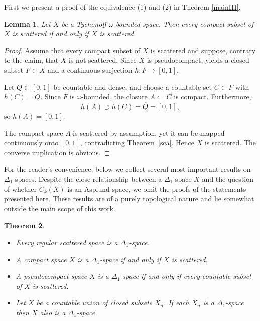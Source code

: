 \documentclass[12pt]{amsart}
\theoremstyle{plain}
\newtheorem{theorem}{Theorem}[section]
\newtheorem{lemma}[theorem]{Lemma}
\theoremstyle{definition}
\theoremstyle{remark}
\begin{document}
First we present a proof of the equivalence (1) and (2) in Theorem \ref{mainIII}.
\begin{lemma}\label{ten}
Let $X$ be a Tychonoff $\omega$-bounded space. Then every compact subset of $X$ is scattered
if and only if  $X$ is scattered.
\end{lemma}
\begin{proof}
Assume that every compact subset of $X$ is scattered and suppose, contrary to the claim, that $X$ is not scattered. Since $X$ is pseudocompact, \cite[Proposition~5.5]{Leiderman-Tka} yields a closed subset $F\subset X$ and a continuous surjection $h:F\to[0,1]$.

Let $Q\subset[0,1]$ be countable and dense, and choose a countable set $C\subset F$ with $h(C)=Q$. Since $F$ is $\omega$-bounded, the closure $A:=\overline{C}$ is compact. Furthermore,
\[
h(A)\supset\overline{h(C)}=\overline{Q}=[0,1],
\]
so $h(A)=[0,1]$.

The compact space $A$ is scattered by assumption, yet it can be mapped continuously onto $[0,1]$, contradicting Theorem~\ref{sca}. Hence $X$ is scattered. The converse implication is obvious.
\end{proof}

For the reader's convenience, below we collect several most important results on $\Delta_1$-spaces.
Despite the close relationship between a $\Delta_1$-space $X$ and the question of whether $C_k(X)$ is an Asplund space,
 we omit the proofs of the statements presented here. These results are of a purely topological nature and lie somewhat outside the main scope of this work.
\begin{theorem}\label{del-1}\hfill
\begin{itemize}
\item [(a)] \cite[Theorem 2.15]{KKuL1}
Every regular scattered space is a $\Delta_1$-space.
\item [(b)]  \cite[Corollary 2.16]{KKuL1}
A compact space $X$ is a $\Delta_1$-space if and only if $X$ is scattered.
\item [(c)]  \cite[Theorem 2.9]{KKuL1}
A pseudocompact space $X$ is a $\Delta_1$-space if and only if every countable subset of $X$ is scattered.
\item [(d)]  \cite[Theorem 3.9]{KKuL1}
Let $X$ be a countable union of closed subsets $X_n$. If each $X_n$ is a $\Delta_1$-space
then $X$ also is a $\Delta_1$-space.
\end{itemize}
\end{theorem}
\end{document}
